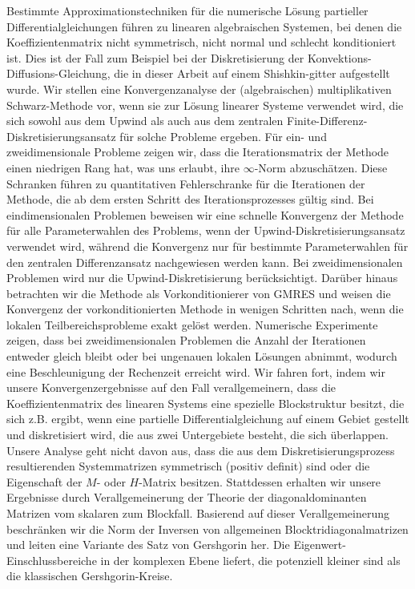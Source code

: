 \begin{changemargin}{-0.35cm}{-0.35cm}
\noindent Bestimmte Approximationstechniken für die numerische Lösung partieller Differentialgleichungen führen zu linearen algebraischen Systemen, bei denen die Koeffizientenmatrix nicht symmetrisch, nicht normal und schlecht konditioniert ist. Dies ist der Fall zum Beispiel bei der Diskretisierung der Konvektions-Diffusions-Gleichung, die in dieser Arbeit auf einem  Shishkin-gitter aufgestellt wurde. Wir stellen eine Konvergenzanalyse der (algebraischen) multiplikativen Schwarz-Methode vor, wenn sie zur Lösung linearer Systeme verwendet wird, die sich sowohl aus dem Upwind als auch aus dem zentralen Finite-Differenz-Diskretisierungsansatz für solche Probleme ergeben. Für ein- und zweidimensionale Probleme zeigen wir, dass die Iterationsmatrix der Methode einen niedrigen Rang hat, was uns erlaubt, ihre $\infty$-Norm abzuschätzen. Diese Schranken führen zu quantitativen Fehlerschranke für die Iterationen der Methode, die ab dem ersten Schritt des Iterationsprozesses gültig sind. Bei eindimensionalen Problemen beweisen wir eine schnelle Konvergenz der Methode für alle Parameterwahlen des Problems, wenn der Upwind-Diskretisierungsansatz verwendet wird, während die Konvergenz nur für bestimmte Parameterwahlen für den zentralen Differenzansatz nachgewiesen werden kann. Bei zweidimensionalen Problemen wird nur die Upwind-Diskretisierung berücksichtigt.
Darüber hinaus betrachten wir die Methode als Vorkonditionierer von GMRES und weisen die Konvergenz der vorkonditionierten Methode in wenigen Schritten nach, wenn die lokalen Teilbereichsprobleme exakt gelöst werden. Numerische Experimente zeigen, dass bei zweidimensionalen Problemen die Anzahl der Iterationen entweder gleich bleibt oder bei ungenauen lokalen Lösungen abnimmt, wodurch eine Beschleunigung der Rechenzeit erreicht wird.
Wir fahren fort, indem wir unsere Konvergenzergebnisse auf den Fall verallgemeinern, dass die Koeffizientenmatrix des linearen Systems eine spezielle Blockstruktur besitzt, die sich z.B. ergibt, wenn eine partielle Differentialgleichung auf einem Gebiet gestellt und diskretisiert wird, die aus zwei Untergebiete besteht, die sich überlappen. Unsere Analyse geht nicht davon aus, dass die aus dem Diskretisierungsprozess resultierenden Systemmatrizen symmetrisch (positiv definit) sind oder die Eigenschaft der $M$- oder $H$-Matrix besitzen. Stattdessen erhalten wir unsere Ergebnisse durch Verallgemeinerung der Theorie der diagonaldominanten Matrizen vom skalaren zum Blockfall. Basierend auf dieser Verallgemeinerung beschränken wir die Norm der Inversen von allgemeinen Blocktridiagonalmatrizen und leiten eine Variante des Satz von Gershgorin her. Die Eigenwert-Einschlussbereiche in der komplexen Ebene liefert, die potenziell kleiner sind als die klassischen Gershgorin-Kreise.


\end{changemargin}
